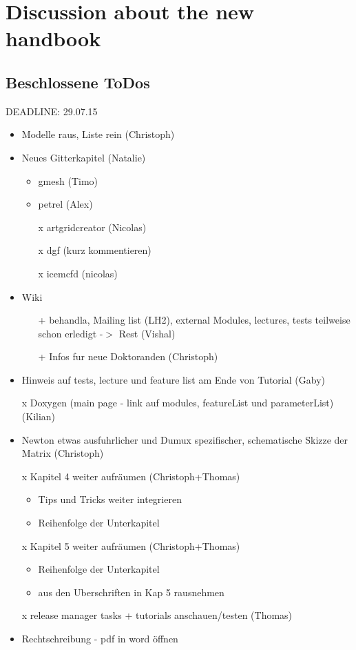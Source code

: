 \chapter*{Discussion about the new handbook}
\section*{Beschlossene ToDos}
DEADLINE: 29.07.15
\begin{itemize}
  \item Modelle raus, Liste rein (Christoph)
  \item Neues Gitterkapitel (Natalie)
  \begin{itemize}
    \item gmesh (Timo)
    \item petrel (Alex)
    \item[x] artgridcreator (Nicolas)
    \item[x] dgf (kurz kommentieren)
    \item[x] icemcfd (nicolas)
  \end{itemize}
  \item Wiki
  \begin{itemize}
    \item[+] behandla, Mailing list (LH2), external Modules, lectures, tests
             teilweise schon erledigt -$>$ Rest (Vishal)
    \item[+] Infos fur neue Doktoranden (Christoph)
  \end{itemize}
  \item Hinweis auf tests, lecture und feature list am Ende von Tutorial
        (Gaby)
  \item[x] Doxygen (main page - link auf modules, featureList und parameterList)
        (Kilian)
  \item Newton etwas ausfuhrlicher und Dumux spezifischer, schematische
        Skizze der Matrix (Christoph)
  \item[x] Kapitel 4 weiter aufräumen (Christoph+Thomas)
  \begin{itemize}
    \item Tips und Tricks weiter integrieren
    \item Reihenfolge der Unterkapitel
  \end{itemize}
  \item[x] Kapitel 5 weiter aufräumen (Christoph+Thomas)
  \begin{itemize}
    \item Reihenfolge der Unterkapitel
    \item \Dumux aus den Uberschriften in Kap 5 rausnehmen
  \end{itemize}
  \item[x] release manager tasks + tutorials anschauen/testen (Thomas)
  \item Rechtschreibung - pdf in word öffnen
\end{itemize}

